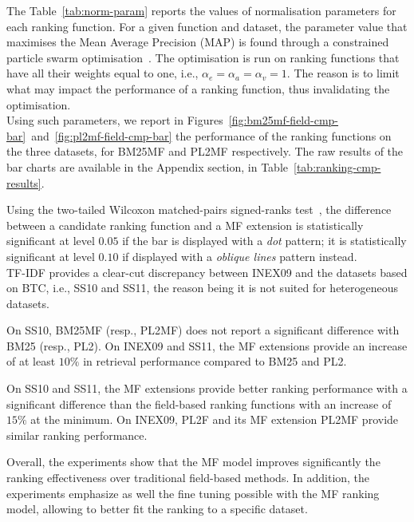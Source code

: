 The Table~\ref{tab:norm-param} reports the values of normalisation parameters for each ranking function. For a given function and dataset, the parameter value that maximises the Mean Average Precision (MAP) is found through a constrained particle swarm optimisation~\cite{xiaohui:2002:sci}. The optimisation is run on ranking functions that have all their weights equal to one, i.e., $\alpha_e = \alpha_a = \alpha_v = 1$. The reason is to limit what may impact the performance of a ranking function, thus invalidating the optimisation.\\



Using such parameters, we report in Figures~\ref{fig:bm25mf-field-cmp-bar}~and~\ref{fig:pl2mf-field-cmp-bar} the performance of the ranking functions on the three datasets, for \gls{BM25MF} and \gls{PL2MF} respectively. The raw results of the bar charts are available in the Appendix section, in Table~\ref{tab:ranking-cmp-results}.

Using the two-tailed Wilcoxon matched-pairs signed-ranks test~\cite{sheskin:2003:CRC,buttcher:2010:IRI:1869919}, the difference between a candidate ranking function and a \gls{MF} extension is statistically significant at level $0.05$ if the bar is displayed with a \textit{dot} pattern; it is statistically significant at level $0.10$ if displayed with a \emph{oblique lines} pattern instead.\\

TF-IDF provides a clear-cut discrepancy between INEX09 and the datasets based on BTC, i.e., SS10 and SS11, the reason being it is not suited for heterogeneous datasets.

On SS10, \gls{BM25MF} (resp., \gls{PL2MF}) does not report a significant difference with BM25 (resp., PL2). On INEX09 and SS11, the \gls{MF} extensions provide an increase of at least $10\%$ in retrieval performance compared to BM25 and PL2.

On SS10 and SS11, the \gls{MF} extensions provide better ranking performance with a significant difference than the field-based ranking functions with an increase of $15\%$ at the minimum. On INEX09, PL2F and its \gls{MF} extension \gls{PL2MF} provide similar ranking performance.

Overall, the experiments show that the \gls{MF} model improves significantly the ranking effectiveness over traditional field-based methods. In addition, the experiments emphasize as well the fine tuning possible with the \gls{MF} ranking model, allowing to better fit the ranking to a specific dataset.

